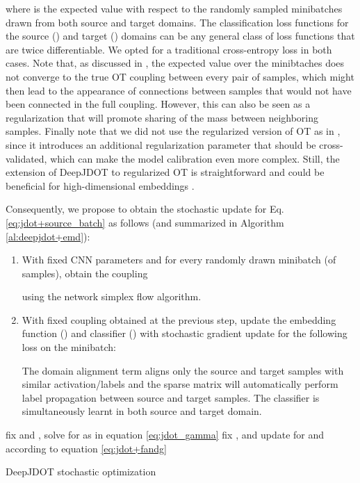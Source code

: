 \documentclass[runningheads]{llncs}
\begin{document}
where  is the expected value with respect to the randomly sampled minibatches drawn from both source and target domains. The classification loss functions for the source () and target () domains can be any general class of loss functions that are twice differentiable. We opted for a traditional cross-entropy loss in both cases. Note that, as discussed in \cite{genevay2017sinkhorn}, the expected value over the minibtaches does not converge to the true OT coupling between every pair of samples, which might then lead to the appearance of connections between samples that would not have been connected in the full coupling. However, this can also be seen as a regularization that will promote sharing of the mass between neighboring samples. Finally note that we did not use the regularized version of OT as in \cite{genevay2017sinkhorn}, since it introduces an additional regularization parameter that should be cross-validated, which can make the model calibration even more complex. Still, the extension of DeepJDOT to regularized OT is straightforward and could be beneficial for high-dimensional embeddings .


Consequently, we propose to obtain the stochastic update for Eq.\eqref{eq:jdot+source_batch}
as follows (and summarized in Algorithm \ref{al:deepjdot+emd}):
\begin{enumerate}
    \item With fixed CNN parameters  and for every randomly drawn minibatch (of  samples), obtain the coupling
    
    using the network simplex flow algorithm. 
    \item With fixed coupling  obtained at the previous step, update the embedding function () and classifier () with stochastic gradient update for the following loss on the minibatch:
    
The domain alignment term aligns only the source and target samples with similar activation/labels and the sparse matrix  will automatically perform label propagation between source and target samples. The classifier  is simultaneously learnt in both source and target domain.
\end{enumerate}


\begin{algorithm}[!t]
  \begin{algorithmic}[1]
   \State fix  and , solve for  as in {equation} \eqref{eq:jdot_gamma}
   \State fix , and update for  and  according to {equation} \eqref{eq:jdot+fandg}   	
    \EndFor
    \label{al:deepjdot+emd}
  \end{algorithmic}
  \caption{DeepJDOT stochastic optimization}
\end{algorithm} 
\end{document}

